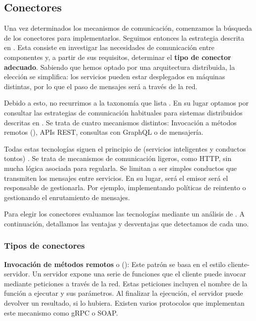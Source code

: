 \subsection{Conectores}

Una vez determinados los mecanismos de comunicación, comenzamos la búsqueda de los conectores para implementarlos. Seguimos entonces la estrategia descrita en \cite{taylorSoftwareArchitectureFoundations2009}. Esta consiste en investigar las necesidades de comunicación entre componentes y, a partir de sus requisitos, determinar el \textbf{tipo de conector adecuado}. Sabiendo que hemos optado por una arquitectura distribuida, la elección se simplifica: los servicios pueden estar desplegados en máquinas distintas, por lo que el paso de mensajes será a través de la red.

Debido a esto, no recurrimos a la taxonomía que lista \cite{mehtaTaxonomySoftwareConnectors2000}. En su lugar optamos por consultar las estrategias de comunicación habituales para sistemas distribuidos descritas en \cite{newmanBuildingMicroservicesDesigning2021}. Se trata de cuatro mecanismos distintos: Invocación a métodos remotos (), APIs REST, consultas con GraphQL o  de mensajería.

Todas estas tecnologías siguen el principio de \textbf{} (servicios inteligentes y conductos tontos) \cite{lewisMicroservices14}. Se trata de mecanismos de comunicación ligeros, como HTTP, sin mucha lógica asociada para regularla. Se limitan a ser simples conductos que transmiten los mensajes entre servicios. En su lugar, será el emisor será el responsable de gestionarla. Por ejemplo, implementando políticas de reintento o gestionando el enrutamiento de mensajes.

Para elegir los conectores evaluamos las tecnologías mediante un análisis de . A continuación, detallamos las ventajas y desventajas que detectamos de cada uno.

\subsubsection{Tipos de conectores}

\textbf{Invocación de métodos remotos} o (): Este patrón se basa en el estilo cliente-servidor. Un servidor expone una serie de funciones que el cliente puede invocar mediante peticiones a través de la red. \cite{newmanBuildingMicroservicesDesigning2021} Estas peticiones incluyen el nombre de la función a ejecutar y sus parámetros. Al finalizar la ejecución, el servidor puede devolver un resultado, si lo hubiera. Existen varios protocolos que implementan este mecanismo como gRPC o SOAP.


